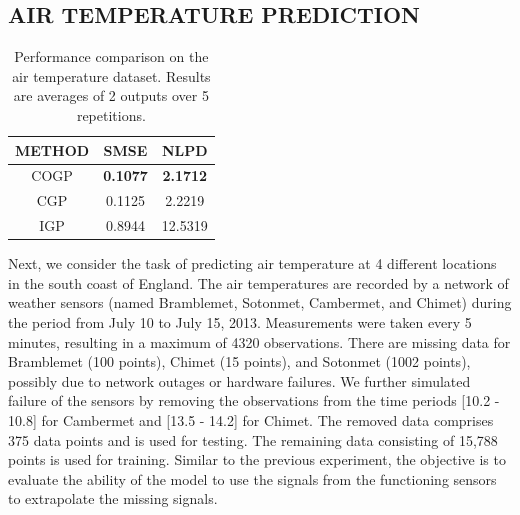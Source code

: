 \subsection{AIR TEMPERATURE PREDICTION}
%
\setlength{\tabcolsep}{4pt}
\begin{table}[t]
\caption{Performance comparison on the air temperature dataset. Results are averages of 2 outputs over 5 repetitions. }
\label{tab:air}
\begin{center}
\begin{tabular}{ccc}
\toprule
\textbf{METHOD} & \textbf{SMSE} & \textbf{NLPD} \\
\hline
COGP & \textbf{0.1077} & \textbf{2.1712} \\
CGP & 0.1125 & 2.2219 \\
IGP & 0.8944 & 12.5319 \\
\bottomrule
\end{tabular}
\end{center}
\end{table}
%
Next, we consider the task of predicting air temperature at 4 different locations in the south coast of England. 
The air temperatures are recorded by a network of weather sensors (named Bramblemet, Sotonmet, Cambermet, and Chimet) during the period from July 10 to July 15, 2013.
Measurements were taken every 5 minutes, resulting in a maximum of 4320 observations.
There are missing data for Bramblemet (100 points), Chimet (15 points), and Sotonmet (1002 points), possibly due to network outages or hardware failures.
We further simulated failure of the sensors by removing the observations from the time periods [10.2 - 10.8] for Cambermet and [13.5 - 14.2] for Chimet.
The removed data comprises 375 data points and  is used for testing. 
The remaining data consisting of 15,788 points is used for training.
Similar to the previous experiment, the objective is to evaluate the ability of the model to use the signals from the functioning sensors to extrapolate the missing signals.

